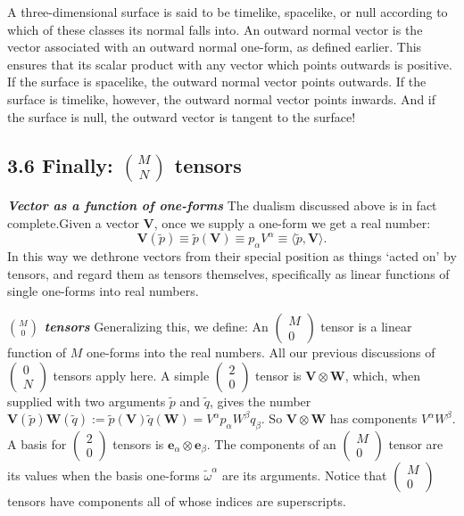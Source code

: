 \documentclass[12pt]{book}
\begin{document}
    A three-dimensional surface is said to be timelike, spacelike, or null according to which of these classes its normal falls into. An outward normal vector is the vector associated with an outward normal one-form, as defined earlier. This ensures that its scalar product with any vector which points outwards is positive. If the surface is spacelike, the outward normal vector points outwards. If the surface is timelike, however, the outward normal vector points inwards. And if the surface is null, the outward vector is tangent to the surface!

    \subsection{3.6 Finally: \(\binom{M}{N}\) tensors}

    \textit{\textbf{Vector as a function of one-forms}}
    The dualism discussed above is in fact complete.Given a vector \(\mathbf{V}\), once we supply a one-form we get a real number:
    \[
    \mathbf{V}(\tilde{p}) \equiv \tilde{p}(\mathbf{V}) \equiv p_\alpha V^\alpha \equiv \langle \tilde{p}, \mathbf{V} \rangle. \tag{3.54}
    \]
    In this way we dethrone vectors from their special position as things ‘acted on’ by tensors, and regard them as tensors themselves, specifically as linear functions of single one-forms into real numbers.
    
    \textit{\textbf{\(\binom{M}{0}\) tensors}}
    Generalizing this, we define:
    An \(\left(\begin{array}{c} M \\ 0 \end{array}\right)\) tensor is a linear function of \(M\) one-forms into the real numbers. All our previous discussions of \(\left(\begin{array}{c} 0 \\ N \end{array}\right)\) tensors apply here. A simple \(\left(\begin{array}{c} 2 \\ 0 \end{array}\right)\) tensor is \(\mathbf{V} \otimes \mathbf{W}\), which, when supplied with two arguments \(\tilde{p}\) and \(\tilde{q}\), gives the number \(\mathbf{V}(\tilde{p})\mathbf{W}(\tilde{q}) := \tilde{p}(\mathbf{V})\tilde{q}(\mathbf{W}) = V^\alpha p_\alpha W^\beta q_\beta\). So \(\mathbf{V} \otimes \mathbf{W}\) has components \(V^\alpha W^\beta\). A basis for \(\left(\begin{array}{c} 2 \\ 0 \end{array}\right)\) tensors is \(\mathbf{e}_\alpha \otimes \mathbf{e}_\beta\). The components of an \(\left(\begin{array}{c} M \\ 0 \end{array}\right)\) tensor are its values when the basis one-forms \(\tilde{\omega}^\alpha\) are its arguments. Notice that \(\left(\begin{array}{c} M \\ 0 \end{array}\right)\) tensors have components all of whose indices are superscripts.
\end{document}

